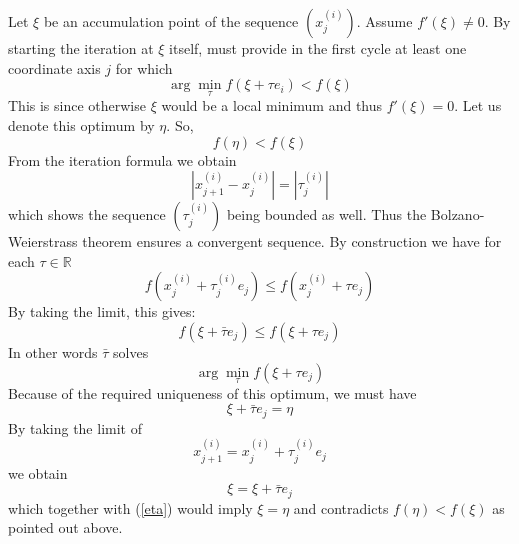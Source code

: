 \documentclass[17pt]{extarticle}
\begin{document}
Let $\xi$ be an accumulation point of the sequence $(x^{(i)}_j)$. Assume $f'(\xi)\neq 0$.
By starting the iteration at $\xi$ itself, must provide 
in the first cycle at least one coordinate axis $j$ for which 
$$
\arg \min_{\tau}f(\xi+\tau e_i)<f(\xi)
$$
This is since otherwise $\xi$ would be a local minimum and thus $f'(\xi)=0$.
Let us denote this optimum by $\eta$. So,
$$
f(\eta)<f(\xi)
$$
From the iteration formula we obtain
$$
|x_{j+1}^{(i)}-x_{j}^{(i)}|=|\tau_{j}^{(i)}|
$$
which shows the sequence $(\tau_j^{(i)})$ being bounded as well.
Thus the Bolzano-Weierstrass theorem ensures a convergent sequence. By construction we have for each $\tau\in \mathbb{R}$
$$
f(x_j^{(i)}+\tau_j^{(i)}e_j)\leq f(x_j^{(i)}+\tau e_j)
$$
By taking the limit, this gives:
$$
f(\xi+\bar{\tau}e_j)\leq f(\xi+\tau e_j)
$$
In other words $\bar{\tau}$ solves
$$
\arg \min_{\tau}f(\xi+\tau e_j)
$$
Because of the required uniqueness of this optimum,
we must have 
\begin{equation} \label{eta}
\xi+\bar{\tau} e_j=\eta
\end{equation}
By taking the limit of 
$$
x_{j+1}^{(i)}=x_j^{(i)}+\tau_j^{(i)}e_j
$$
we obtain
$$
\xi=\xi+\bar{\tau}e_j
$$
which together with (\ref{eta}) would imply $\xi=\eta$ and contradicts $f(\eta)<f(\xi)$
as pointed out above.
\end{document}
